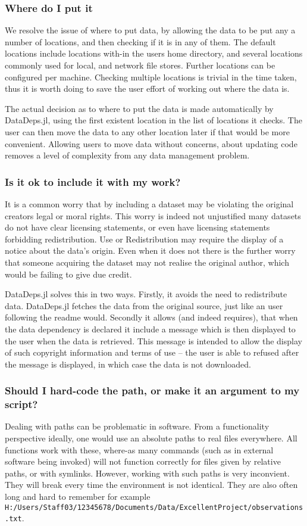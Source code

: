\documentclass{jors}
\begin{document}
\subsubsection{Where do I put it}
We resolve the issue of where to put data, by allowing the data to be put any a number of locations, and then checking if it is in any of them.
The default locations include locations with-in the users home directory, and several locations commonly used for local, and network file stores.
Further locations can be configured per machine.
Checking multiple locations is trivial in the time taken, thus it is worth doing to save the user effort of working out where the data is.

The actual decision as to where to put the data is made automatically by DataDeps.jl, using the first existent location in the list of locations it checks.
The user can then move the data to any other location later if that would be more convenient.
Allowing users to move data without concerns, about updating code removes a level of complexity from any data management problem.


\subsubsection{Is it ok to include it with my work?}
It is a common worry that by including a dataset may be violating the original creators legal or moral rights.
This worry is indeed not unjustified many datasets do not have clear licensing statements,
or even have licensing statements forbidding redistribution.
Use or Redistribution may require the display of a notice about the data's origin.
Even when it does not there is the further worry that someone acquiring the dataset may not realise the original author, which would be failing to give due credit.


DataDeps.jl solves this in two ways.
Firstly, it avoids the need to redistribute data.
DataDeps.jl fetches the data from the original source, just like an user following the readme would.
Secondly it allows (and indeed requires), that when the data dependency is declared it include a message which is then displayed to the user when the data is retrieved.
This message is intended to allow the display of such copyright information and terms of use -- the user is able to refused after the message is displayed, in which case the data is not downloaded.

\subsubsection{Should I hard-code the path, or make it an argument to my script?}
Dealing with paths can be problematic in software.
From a functionality perspective ideally, one would use an absolute paths to real files everywhere.
All functions work with these, where-as many commands (such as in external software being invoked) will not function correctly for files given by relative paths, or with symlinks.
However, working with such paths is very inconvient.
They will break every time the environment is not identical.
They are also often long and hard to remember for example \texttt{H:/Users/Staff03/12345678/Documents/Data/ExcellentProject/observations.txt}.
\end{document}
